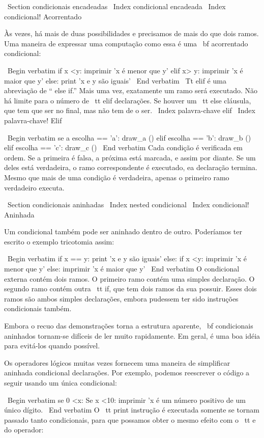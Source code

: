 \documentclass[10pt]{book}
\begin{document}
{{\ Section {} condicionais encadeadas
\ Index {condicional encadeada}
\ Index {condicional! Acorrentado}

Às vezes, há mais de duas possibilidades e precisamos de mais do que
dois ramos. Uma maneira de expressar uma computação como essa é uma {\ bf
acorrentado condicional}:

\ Begin {verbatim}
if x <y:
    imprimir 'x é menor que y'
elif x> y:
    imprimir 'x é maior que y'
else:
    print 'x e y são iguais'
\ End {verbatim}
%
{\ Tt} elif é uma abreviação de `` else if.'' Mais uma vez, exatamente um
ramo será executado. Não há limite para o número de {\ tt
elif} declarações. Se houver um {\ tt} else cláusula, que tem que ser
no final, mas não tem de o ser.
\ Index {palavra-chave elif}
\ Index {palavra-chave! Elif}


\ Begin {verbatim}
se a escolha == 'a':
    draw_a ()
elif escolha == 'b':
    draw_b ()
elif escolha == 'c':
    draw_c ()
\ End {verbatim}
%
Cada condição é verificada em ordem. Se a primeira é falsa,
a próxima está marcada, e assim por diante. Se um deles está
verdadeira, o ramo correspondente é executado, ea declaração
termina. Mesmo que mais de uma condição é verdadeira, apenas o
primeiro ramo verdadeiro executa.  


\ Section {} condicionais aninhadas
\ Index {nested condicional}
\ Index {condicional! Aninhada}

Um condicional também pode ser aninhado dentro de outro. Poderíamos ter
escrito o exemplo tricotomia assim:

\ Begin {verbatim}
if x == y:
    print 'x e y são iguais'
else:
    if x <y:
        imprimir 'x é menor que y'
    else:
        imprimir 'x é maior que y'
\ End {verbatim}
%
O condicional externa contém dois ramos. O
primeiro ramo contém uma simples declaração. O segundo ramo
contém outra {\ tt if}, que tem dois ramos da sua
possuir. Esses dois ramos são ambos simples declarações,
embora pudessem ter sido instruções condicionais também.

Embora o recuo das demonstrações torna a estrutura
aparente, {\ bf condicionais aninhados} tornam-se difíceis de ler muito
rapidamente. Em geral, é uma boa idéia para evitá-los quando possível.

Os operadores lógicos muitas vezes fornecem uma maneira de simplificar aninhada condicional
declarações. Por exemplo, podemos reescrever o código a seguir usando um
única condicional:

\ Begin {verbatim}
se 0 <x:
    Se x <10:
        imprimir 'x é um número positivo de um único dígito.
\ End {verbatim}
%
O {\ tt print} instrução é executada somente se tornam passado tanto
condicionais, para que possamos obter o mesmo efeito com o {\ tt e} do operador:

}}
\end{document}
